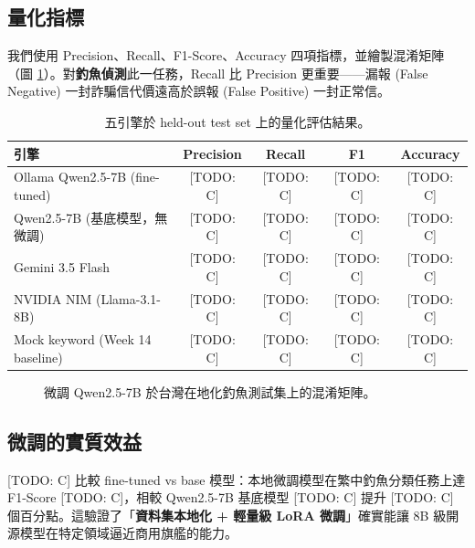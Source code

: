 \documentclass[11pt, a4paper]{article}
\begin{document}
\subsection{量化指標}
我們使用 Precision、Recall、F1-Score、Accuracy 四項指標，並繪製混淆矩陣（圖 \ref{fig:cm}）。對\textbf{釣魚偵測}此一任務，Recall 比 Precision 更重要——漏報 (False Negative) 一封詐騙信代價遠高於誤報 (False Positive) 一封正常信。

\begin{table}[h]
  \centering
  \small
  \begin{tabular}{lcccc}
    \toprule
    \textbf{引擎} & \textbf{Precision} & \textbf{Recall} & \textbf{F1} & \textbf{Accuracy} \\
    \midrule
    Ollama Qwen2.5-7B (fine-tuned)        & [TODO: C] & [TODO: C] & [TODO: C] & [TODO: C] \\
    Qwen2.5-7B (基底模型，無微調)         & [TODO: C] & [TODO: C] & [TODO: C] & [TODO: C] \\
    Gemini 3.5 Flash                      & [TODO: C] & [TODO: C] & [TODO: C] & [TODO: C] \\
    NVIDIA NIM (Llama-3.1-8B)             & [TODO: C] & [TODO: C] & [TODO: C] & [TODO: C] \\
    Mock keyword (Week 14 baseline)        & [TODO: C] & [TODO: C] & [TODO: C] & [TODO: C] \\
    \bottomrule
  \end{tabular}
  \caption{五引擎於 held-out test set 上的量化評估結果。}
  \label{tab:metrics}
\end{table}

\begin{figure}[h]
  \centering
  \caption{微調 Qwen2.5-7B 於台灣在地化釣魚測試集上的混淆矩陣。}
  \label{fig:cm}
\end{figure}

\subsection{微調的實質效益}
[TODO: C] 比較 fine-tuned vs base 模型：本地微調模型在繁中釣魚分類任務上達 F1-Score [TODO: C]，相較 Qwen2.5-7B 基底模型 [TODO: C] 提升 [TODO: C]\,個百分點。這驗證了「\textbf{資料集本地化 + 輕量級 LoRA 微調}」確實能讓 8B 級開源模型在特定領域逼近商用旗艦的能力。
\end{document}

